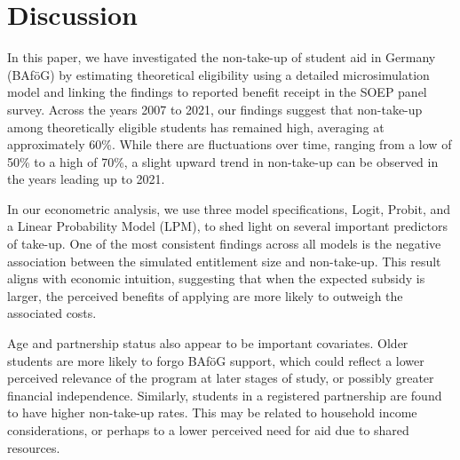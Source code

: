 \section{Discussion}

In this paper, we have investigated the non-take-up of student aid in Germany (BAföG) by estimating theoretical eligibility using a detailed microsimulation model and linking the findings to reported benefit receipt in the SOEP panel survey. Across the years 2007 to 2021, our findings suggest that non-take-up among theoretically eligible students has remained high, averaging at approximately 60\%. While there are fluctuations over time, ranging from a low of 50\% to a high of 70\%, a slight upward trend in non-take-up can be observed in the years leading up to 2021.


In our econometric analysis, we use three model specifications, Logit, Probit, and a Linear Probability Model (LPM), to shed light on several important predictors of take-up. One of the most consistent findings across all models is the negative association between the simulated entitlement size and non-take-up. This result aligns with economic intuition, suggesting that when the expected subsidy is larger, the perceived benefits of applying are more likely to outweigh the associated costs.

Age and partnership status also appear to be important covariates. Older students are more likely to forgo BAföG support, which could reflect a lower perceived relevance of the program at later stages of study, or possibly greater financial independence. Similarly, students in a registered partnership are found to have higher non-take-up rates. This may be related to household income considerations, or perhaps to a lower perceived need for aid due to shared resources.


